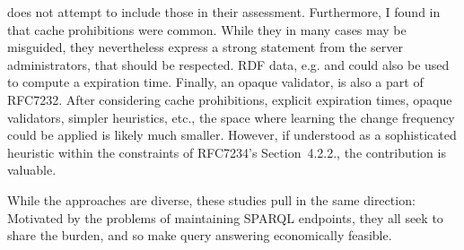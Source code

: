 does not attempt to include those in their assessment. Furthermore, I
found in \cite{kjernsmo_survey_2015} that cache prohibitions were
common. While they in many cases may be misguided, they nevertheless
express a strong statement from the server administrators, that should
be respected. RDF data, e.g.  and
 could also be used to compute a expiration
time. Finally, an opaque validator,  is also a part of
RFC7232. After considering cache prohibitions, explicit expiration
times, opaque validators, simpler heuristics, etc., the space where
learning the change frequency could be applied is likely much
smaller. However, if understood as a sophisticated heuristic within
the constraints of RFC7234's Section~4.2.2., the contribution is
valuable.



While the approaches are diverse, these studies pull in the same
direction: Motivated by the problems of maintaining SPARQL endpoints,
they all seek to share the burden, and so make query answering
economically feasible.



